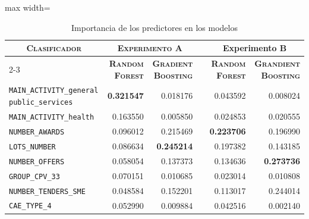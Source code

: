 \documentclass[a4paper,fleqn]{cas-sc}
\begin{document}
\begin{table}[t]		
	
	\small
	\setlength{\tabcolsep}{7pt}
		\renewcommand{\arraystretch}{1.3} %
		\caption{Importancia de los  predictores en los modelos}	
			\label{tab:importancia_predictores}
\centering		
	\begin{adjustbox}{max width=\textwidth}		
		\begin{tabular}{p{3.5cm}rrcrr}			
		\hline
		\multicolumn{1}{c}{\multirow{2}{*}{\textbf{\textsc{Clasificador}}}} & \multicolumn{2}{c}{\textbf{\textsc{Experimento A}}}          &         & \multicolumn{2}{c}{\textbf{Experimento B}} \\ \cline{2-3} \cline{5-6} 
		\multicolumn{1}{c}{} &
		\multicolumn{1}{p{1.5cm}}{\textbf{\textsc{Random Forest}}} &
		\multicolumn{1}{p{2cm}}{\textbf{\textsc{Gradient Boosting}}} & &
		\multicolumn{1}{p{1.5cm}}{\textbf{\textsc{Random Forest}}} &
		\multicolumn{1}{p{2cm}}{\textbf{\textsc{Grandient Boosting}}} \\ \hline
		\texttt{MAIN\_ACTIVITY\_general public\_services} & \textbf{0.321547}      & 0.018176                   & & 0.043592               & 0.008024                   \\ %
		\texttt{MAIN\_ACTIVITY\_health}                   & 0.163550               & 0.005850        &           & 0.024853               & 0.020555                   \\ %
		\texttt{NUMBER\_AWARDS}                           & 0.096012               & 0.215469              &     & \textbf{0.223706}      & 0.196990                   \\ %
		\texttt{LOTS\_NUMBER}                             & 0.086634               & \textbf{0.245214}     &     & 0.197382               & 0.143185                   \\ %
		\texttt{NUMBER\_OFFERS}                           & 0.058054               & 0.137373            &       & 0.134636               & \textbf{0.273736}          \\ %
		\texttt{GROUP\_CPV\_33}                           & 0.070151               & 0.010685           &        & 0.023014               & 0.010808                   \\ %
		\texttt{NUMBER\_TENDERS\_SME}                     & 0.048584               & 0.152201     &              & 0.113017               & 0.244014                   \\ %
		\texttt{CAE\_TYPE\_4}                             & 0.052990               & 0.009884            &       & 0.042516               & 0.002140                   \\ %

\end{tabular}
\end{adjustbox}
\end{table}
\end{document}
